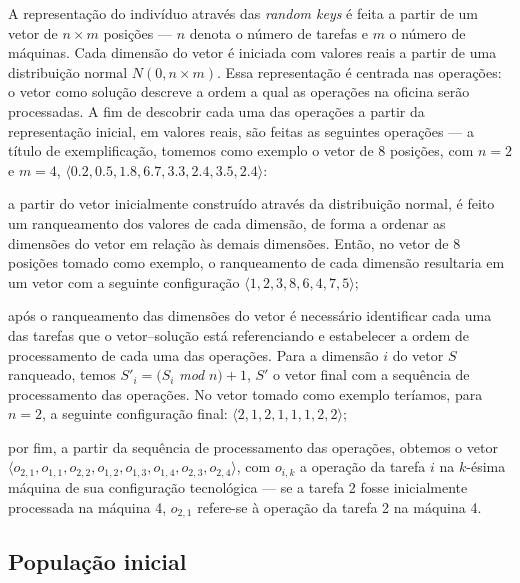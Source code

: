 \documentclass[relatorio,nocolorlinks]{inf-ufg}
\begin{document}
A representa\c{c}\~{a}o do indiv\'{i}duo atrav\'{e}s das \textit{random keys} \'{e} feita a partir de um vetor de $n \times m$ posi\c{c}\~{o}es
--- $n$ denota o n\'{u}mero de tarefas e $m$ o n\'{u}mero de m\'{a}quinas. Cada dimens\~{a}o do vetor \'{e} iniciada com valores reais a partir
de uma distribui\c{c}\~{a}o normal $N(0, n \times m)$. Essa representa\c{c}\~{a}o \'{e} centrada nas opera\c{c}\~{o}es: o vetor como solu\c{c}\~{a}o
descreve a ordem a qual as opera\c{c}\~{o}es na oficina ser\~{a}o processadas. A fim de descobrir cada uma das opera\c{c}\~{o}es a partir da
representa\c{c}\~{a}o inicial, em valores reais, s\~{a}o feitas as seguintes opera\c{c}\~{o}es --- a t\'{i}tulo de exemplifica\c{c}\~{a}o, tomemos
como exemplo o vetor de 8 posi\c{c}\~{o}es, com $n = 2$ e $m = 4$, $\langle0.2, 0.5, 1.8, 6.7, 3.3, 2.4, 3.5, 2.4\rangle$:
\begin{inparaenum}[\itshape 1\upshape)]
\item a partir do vetor inicialmente constru\'{i}do atrav\'{e}s da distribui\c{c}\~{a}o normal, \'{e} feito um ranqueamento dos valores de cada
dimens\~{a}o, de forma a ordenar as dimens\~{o}es do vetor em rela\c{c}\~{a}o \`{a}s demais dimens\~{o}es. Ent\~{a}o, no vetor de 8 posi\c{c}\~{o}es
tomado como exemplo, o ranqueamento de cada dimens\~{a}o resultaria em um vetor com a seguinte configura\c{c}\~{a}o
$\langle1, 2, 3, 8, 6, 4, 7, 5\rangle$;
\item ap\'{o}s o ranqueamento das dimens\~{o}es do vetor \'{e} necess\'{a}rio identificar cada uma das tarefas que o vetor--solu\c{c}\~{a}o est\'{a}
referenciando e estabelecer a ordem de processamento de cada uma das opera\c{c}\~{o}es. Para a dimens\~{a}o $i$ do vetor $S$ ranqueado, temos
$S'_{i} = (S_{i}$ \textit{mod} $n) + 1$, $S'$ o vetor final com a sequ\^{e}ncia de processamento das opera\c{c}\~{o}es. No vetor tomado como exemplo
ter\'{i}amos, para $n = 2$, a seguinte configura\c{c}\~{a}o final: $\langle2, 1, 2, 1, 1, 1, 2, 2\rangle$;
\item por fim, a partir da sequ\^{e}ncia de processamento das opera\c{c}\~{o}es, obtemos o vetor 
$\langle o_{2,1}, o_{1,1}, o_{2,2}, o_{1,2}, o_{1,3}, o_{1,4}, o_{2,3}, o_{2,4}\rangle$, com $o_{i,k}$ a opera\c{c}\~{a}o da tarefa $i$ na
$k$-\'{e}sima m\'{a}quina de sua configura\c{c}\~{a}o tecnol\'{o}gica --- se a tarefa 2 fosse inicialmente processada na m\'{a}quina 4, $o_{2,1}$
refere-se \`{a} opera\c{c}\~{a}o da tarefa 2 na m\'{a}quina 4.
\end{inparaenum}

\subsection{Popula\c{c}\~{a}o inicial}
\label{inicial}
\end{document}
